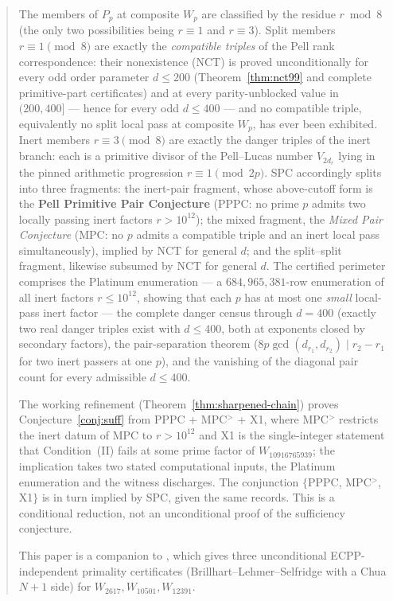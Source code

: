 \documentclass[11pt]{amsart}
\theoremstyle{plain}
\theoremstyle{definition}
\theoremstyle{remark}
\numberwithin{equation}{section}
\begin{document}
\begin{abstract}
The members of $P_p$ at composite $W_p$ are classified by the residue $r \bmod 8$ (the only two possibilities being $r \equiv 1$ and $r \equiv 3$). Split members $r \equiv 1 \pmod 8$ are exactly the \emph{compatible triples} of the Pell rank correspondence: their nonexistence (NCT) is proved unconditionally for every odd order parameter $d \leq 200$ (Theorem~\ref{thm:nct99} and complete primitive-part certificates) and at every parity-unblocked value in $(200, 400]$ --- hence for every odd $d \leq 400$ --- and no compatible triple, equivalently no split local pass at composite $W_p$, has ever been exhibited. Inert members $r \equiv 3 \pmod 8$ are exactly the danger triples of the inert branch: each is a primitive divisor of the Pell--Lucas number $V_{2 d_r}$ lying in the pinned arithmetic progression $r \equiv 1 \pmod{2p}$. SPC accordingly splits into three fragments: the inert-pair fragment, whose above-cutoff form is the \textbf{Pell Primitive Pair Conjecture} (PPPC: no prime $p$ admits two locally passing inert factors $r > 10^{12}$); the mixed fragment, the \emph{Mixed Pair Conjecture} (MPC: no $p$ admits a compatible triple and an inert local pass simultaneously), implied by NCT for general $d$; and the split--split fragment, likewise subsumed by NCT for general $d$. The certified perimeter comprises the Platinum enumeration --- a $684{,}965{,}381$-row enumeration of all inert factors $r \leq 10^{12}$, showing that each $p$ has at most one \emph{small} local-pass inert factor --- the complete danger census through $d = 400$ (exactly two real danger triples exist with $d \leq 400$, both at exponents closed by secondary factors), the pair-separation theorem ($8 p \gcd(d_{r_1}, d_{r_2}) \mid r_2 - r_1$ for two inert passers at one $p$), and the vanishing of the diagonal pair count for every admissible $d \leq 400$.

The working refinement (Theorem~\ref{thm:sharpened-chain}) proves Conjecture~\ref{conj:suff} from PPPC + MPC$^{>}$ + X1, where MPC$^{>}$ restricts the inert datum of MPC to $r > 10^{12}$ and X1 is the single-integer statement that Condition~(II) fails at some prime factor of $W_{10916765939}$; the implication takes two stated computational inputs, the Platinum enumeration and the witness discharges. The conjunction $\{$PPPC, MPC$^{>}$, X1$\}$ is in turn implied by SPC, given the same records. This is a conditional reduction, not an unconditional proof of the sufficiency conjecture.

This paper is a companion to \cite{ref:A}, which gives three unconditional ECPP-independent primality certificates (Brillhart--Lehmer--Selfridge with a Chua $N+1$ side) for $W_{2617}, W_{10501}, W_{12391}$.
\end{abstract}
\end{document}

